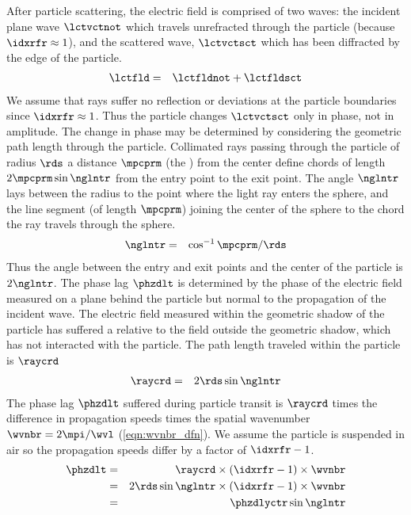 \documentclass[12pt]{article}
\begin{document}
After particle scattering, the electric field is comprised of
two waves: the incident plane wave $\lctvctnot$ which travels
unrefracted through the particle (because $\idxrfr \approx 1$),
and the scattered wave, $\lctvctsct$ which has been diffracted by the 
edge of the particle. 
\begin{eqnarray}
\lctfld & = & \lctfldnot + \lctfldsct
\end{eqnarray}
We assume that rays suffer no reflection or deviations at the particle
boundaries since $\idxrfr \approx 1$. 
Thus the particle changes $\lctvctsct$ only in phase, not in amplitude.
The change in phase may be determined by considering the geometric
path length through the particle.
Collimated rays passing through the particle of radius $\rds$ a
distance $\mpcprm$ (the ) from the center
define chords of length $2\mpcprm \sin \nglntr$ from the entry point 
to the exit point. 
The angle $\nglntr$ lays between the radius to the point where the light
ray enters the sphere, and the line segment (of length $\mpcprm$)
joining the center of the sphere to the chord the ray travels through
the sphere.
\begin{eqnarray}
\nglntr & = & \cos^{-1} \mpcprm / \rds
\label{eqn:ngl_ntr_dfn}
\end{eqnarray}
Thus the angle between the entry and exit points and the center
of the particle is $2\nglntr$.
The phase lag $\phzdlt$ is determined by the phase of the electric
field measured on a plane behind the particle but normal to the
propagation of the incident wave.
The electric field measured within the geometric shadow of the
particle has suffered a  relative to the field
outside the geometric shadow, which has not interacted with the
particle.   
The path length traveled within the particle is $\raycrd$
\begin{eqnarray}
\raycrd & = & 2 \rds \sin \nglntr
\label{eqn:ray_crd_dfn}
\end{eqnarray}
The phase lag $\phzdlt$ suffered during particle transit is $\raycrd$ 
times the difference in propagation speeds times the spatial
wavenumber $\wvnbr = 2\mpi / \wvl$ (\ref{eqn:wvnbr_dfn}).
We assume the particle is suspended in air so the propagation
speeds differ by a factor of $\idxrfr - 1$.
\begin{eqnarray}
\phzdlt & = & 
\raycrd \times (\idxrfr - 1 ) \times \wvnbr \nonumber \\
& = &  2 \rds \sin \nglntr \times (\idxrfr - 1 ) \times \wvnbr \nonumber \\
& = & \phzdlyctr \sin \nglntr
\label{eqn:phz_dlt_dfn}
\end{eqnarray}
\end{document}
